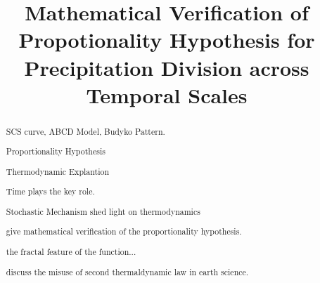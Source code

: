 \documentclass[draft,wrr]{AGUTeX}
\begin{document}

\title{Mathematical Verification of Propotionality Hypothesis for Precipitation Division across Temporal Scales}









\begin{abstract}

SCS curve, ABCD Model, Budyko Pattern. 

Proportionality Hypothesis

Thermodynamic Explantion

Time plays the key role.

Stochastic Mechanism shed light on thermodynamics

give mathematical verification of the proportionality hypothesis.

the fractal feature of the function...

discuss the misuse of second thermaldynamic law in earth science.

\end{abstract}

\end{document}
